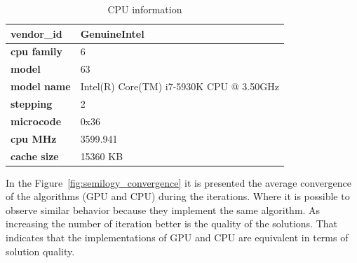 \documentclass{article}
\begin{document}
    \begin{table}[!htb]
        \centering
        \caption{CPU information}
        \label{tbl:cpuinfo}
        \begin{tabular}{|l|l|}
            \hline
            \textbf{vendor\_id} & GenuineIntel                             \\ \hline
            \textbf{cpu family} & 6                                        \\ \hline
            \textbf{model}      & 63                                       \\ \hline
            \textbf{model name} & Intel(R) Core(TM) i7-5930K CPU @ 3.50GHz \\ \hline
            \textbf{stepping}   & 2                                        \\ \hline
            \textbf{microcode}  & 0x36                                     \\ \hline
            \textbf{cpu MHz}    & 3599.941                                 \\ \hline
            \textbf{cache size} & 15360 KB                                 \\ \hline
        \end{tabular}
    \end{table}

    In the Figure~\ref{fig:semilogy_convergence} it is presented the average convergence of the algorithms (GPU and CPU) during the iterations. Where it is possible to observe similar behavior because they implement the same algorithm.
    As increasing the number of iteration better is the quality of the solutions. 
    That indicates that the implementations of GPU and CPU are equivalent in terms of solution quality.

\end{document}
